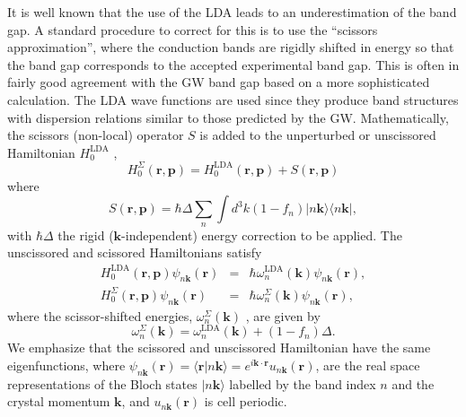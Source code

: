 \documentclass[floatfix,prb,aps,superscriptaddress,showpacs,11pt,preprint,letterpaper]{revtex4}
\begin{document}
It is well known that the use of the LDA
leads to an underestimation of the band gap. A standard
procedure to correct for this is to
use the ``scissors approximation'', where the 
conduction bands are rigidly shifted in energy so that the band gap 
corresponds to the accepted 
experimental band gap.\cite{levinePRL89,levinePRL91,delsolePRB93} 
This is often in fairly good agreement with the GW
band gap based on a more sophisticated calculation.\cite{hybertsenPRB86}
The LDA wave functions are used since they produce band
structures with dispersion relations similar to those predicted by the GW.
Mathematically, the scissors (non-local) operator 
$S$ is added to the unperturbed or unscissored Hamiltonian $H^{\mathrm{LDA}}_{0}$ ,
\begin{equation*}
H^\Sigma_{0}(\mathbf{r},\mathbf{p})=H^{\mathrm{LDA}}_{0}(\mathbf{r},\mathbf{p})+S(\mathbf{r},\mathbf{p})
\end{equation*}
where 
\begin{equation}
S(\mathbf{r},\mathbf{p})=\hbar \Delta\sum_{n}\int d^{3}k(1-f_{n})
|n\mathbf{k}\rangle\langle n\mathbf{k}|,
\label{hats}
\end{equation}
with $\hbar \Delta$  the rigid ($\mathbf{k}$-independent) energy correction to be
applied. 
The unscissored and scissored Hamiltonians satisfy 
\begin{eqnarray*}
H^{\mathrm{LDA}}_{0}(\mathbf{r},\mathbf{p})\psi _{n\mathbf{k}}(\mathbf{r}) &=&\hbar \omega^{\mathrm{LDA}}_{n}(\mathbf{k})\psi _{n\mathbf{k}}(\mathbf{r}),
\label{hamils} \\
H_{0}^\Sigma (\mathbf{r},\mathbf{p})\psi _{n\mathbf{k}}(\mathbf{r}) &=&\hbar \omega_{n}^\Sigma
(\mathbf{k})\psi _{n\mathbf{k}}(\mathbf{r}),
\end{eqnarray*}
where the scissor-shifted energies, 
$\omega_{n}^\Sigma(\mathbf{k})$ , are given by
\begin{equation}
\omega_{n}^\Sigma(\mathbf{k})=\omega^\mathrm{LDA}_{n}(\mathbf{k})+(1-f_{n})\Delta.
\label{wese}
\end{equation}
We emphasize that the scissored and unscissored Hamiltonian 
have the same eigenfunctions, where
$\psi_{n\mathbf{k}}(\mathbf{r})=\langle\mathbf{r}|n\mathbf{k}\rangle=e^{i\mathbf{k}\cdot\mathbf{r}}u_{n\mathbf{k}}(\mathbf{r})$,
are the real space representations of the Bloch states $| n\mathbf{k}\rangle$ labelled 
by the band index $n$ and the crystal momentum $\mathbf{k}$, and $u_{n\mathbf{k}}(\mathbf{r})$
is cell periodic. 
\end{document}
